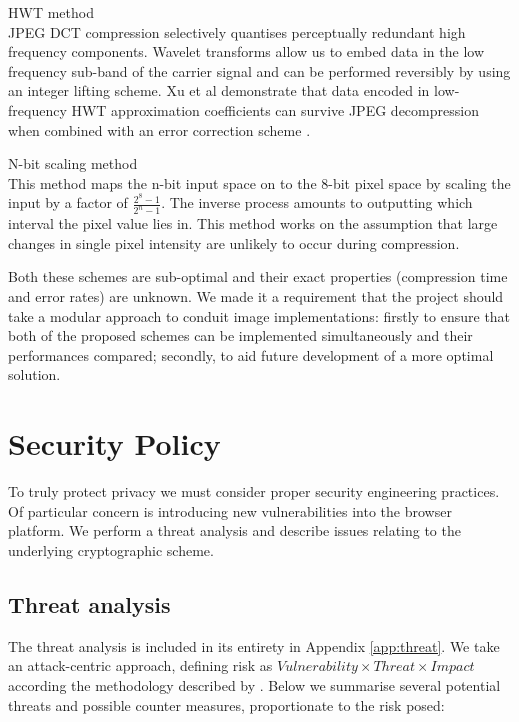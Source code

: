 \begin{sdesc}

    \item[HWT method] \hfill \\ JPEG DCT compression selectively quantises perceptually redundant high frequency components. Wavelet transforms allow us to embed data in the low frequency sub-band of the carrier signal and can be performed reversibly by using an integer lifting scheme. Xu et al demonstrate that data encoded in low-frequency HWT approximation coefficients can survive JPEG decompression when combined with an error correction scheme \cite{haar}.
    
    \item[N-bit scaling method] \hfill \\ This method maps the n-bit input space on to the 8-bit pixel space by scaling the input by a factor of $ \frac{2^8 - 1}{2^n - 1}$. The inverse process amounts to outputting which interval the pixel value lies in. This method works on the assumption that large changes in single pixel intensity are unlikely to occur during compression.

\end{sdesc}

Both these schemes are sub-optimal and their exact properties (compression time and error rates) are unknown. We made it a requirement that the project should take a modular approach to conduit image implementations: firstly to ensure that both of the proposed schemes can be implemented simultaneously and their performances compared; secondly, to aid future development of a more optimal solution.



\FloatBarrier 
\section{Security Policy}
\label{sec:security}

To truly protect privacy we must consider proper security engineering practices. Of particular concern is introducing new vulnerabilities into the browser platform. We perform a threat analysis and describe issues relating to the underlying cryptographic scheme.

\FloatBarrier
\subsection{Threat analysis}
\label{ssec:threat}

The threat analysis is included in its entirety in Appendix \ref{app:threat}. We take an attack-centric approach, defining risk as $Vulnerability \times Threat \times Impact$ according the methodology described by \cite{security}. Below we summarise several potential threats and possible counter measures, proportionate to the risk posed:


